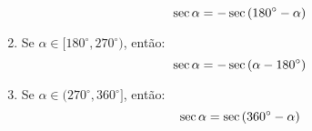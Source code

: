 \begin{frame}
\begin{columns}[onlytextwidth]
\begin{column}{0.49\textwidth}
\begin{highlight}
\begin{enumerate}
          \begin{equation*}
            \sec{\alpha}=-\sec{(180^{\circ}-\alpha)}\vspace*{-0.2cm}
          \end{equation*}
          \item Se $\alpha\in[180^{\circ},270^{\circ})$, então:\vspace*{-0.2cm}
          \begin{equation*}
            \sec{\alpha}=-\sec{(\alpha-180^{\circ})}\vspace*{-0.2cm}
          \end{equation*}
          \item Se $\alpha\in(270^{\circ},360^{\circ}]$, então:\vspace*{-0.2cm}
          \begin{equation*}
            \sec{\alpha}=\sec{(360^{\circ}-\alpha)}\vspace*{-0.2cm}
          \end{equation*}
        \end{enumerate}
      \end{highlight}
    \end{column}
  \end{columns}
\end{frame}

